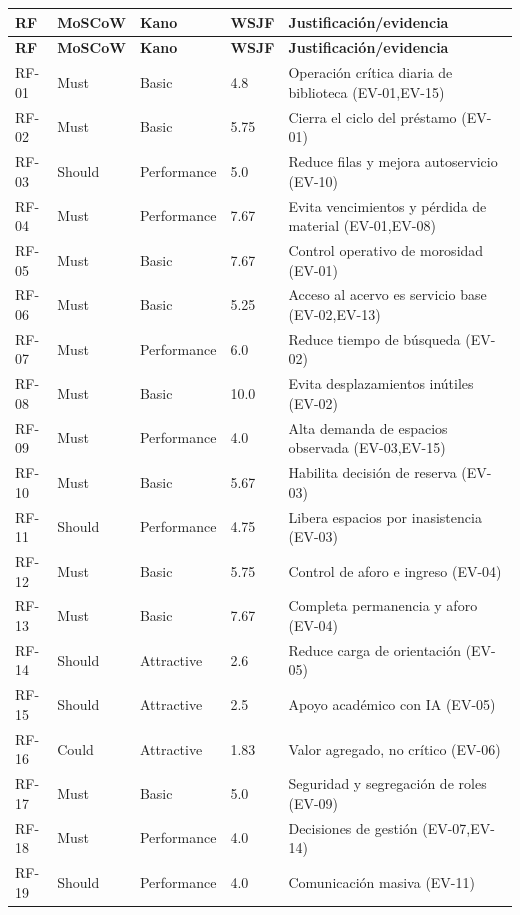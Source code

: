 \documentclass[12pt,journal,onecolumn]{IEEEtran}
\begin{document}
\begin{longtable}{P{0.10\textwidth}P{0.14\textwidth}P{0.14\textwidth}P{0.10\textwidth}P{0.42\textwidth}}\toprule
\textbf{RF} & \textbf{MoSCoW} & \textbf{Kano} & \textbf{WSJF} & \textbf{Justificación/evidencia}\\\midrule\endfirsthead
\toprule\textbf{RF} & \textbf{MoSCoW} & \textbf{Kano} & \textbf{WSJF} & \textbf{Justificación/evidencia}\\\midrule\endhead
RF-01 & Must & Basic & 4.8 & Operación crítica diaria de biblioteca (EV-01,EV-15)\\
RF-02 & Must & Basic & 5.75 & Cierra el ciclo del préstamo (EV-01)\\
RF-03 & Should & Performance & 5.0 & Reduce filas y mejora autoservicio (EV-10)\\
RF-04 & Must & Performance & 7.67 & Evita vencimientos y pérdida de material (EV-01,EV-08)\\
RF-05 & Must & Basic & 7.67 & Control operativo de morosidad (EV-01)\\
RF-06 & Must & Basic & 5.25 & Acceso al acervo es servicio base (EV-02,EV-13)\\
RF-07 & Must & Performance & 6.0 & Reduce tiempo de búsqueda (EV-02)\\
RF-08 & Must & Basic & 10.0 & Evita desplazamientos inútiles (EV-02)\\
RF-09 & Must & Performance & 4.0 & Alta demanda de espacios observada (EV-03,EV-15)\\
RF-10 & Must & Basic & 5.67 & Habilita decisión de reserva (EV-03)\\
RF-11 & Should & Performance & 4.75 & Libera espacios por inasistencia (EV-03)\\
RF-12 & Must & Basic & 5.75 & Control de aforo e ingreso (EV-04)\\
RF-13 & Must & Basic & 7.67 & Completa permanencia y aforo (EV-04)\\
RF-14 & Should & Attractive & 2.6 & Reduce carga de orientación (EV-05)\\
RF-15 & Should & Attractive & 2.5 & Apoyo académico con IA (EV-05)\\
RF-16 & Could & Attractive & 1.83 & Valor agregado, no crítico (EV-06)\\
RF-17 & Must & Basic & 5.0 & Seguridad y segregación de roles (EV-09)\\
RF-18 & Must & Performance & 4.0 & Decisiones de gestión (EV-07,EV-14)\\
RF-19 & Should & Performance & 4.0 & Comunicación masiva (EV-11)\\

\end{longtable}
\end{document}
